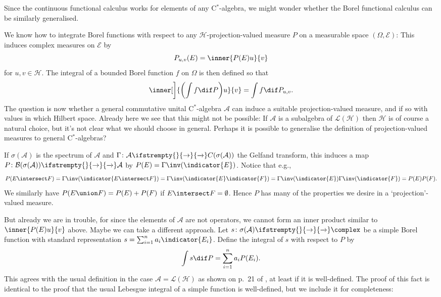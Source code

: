 \documentclass[article, a4paper, 11pt, oneside]{memoir}
\numberwithin{equation}{chapter}
\newcommand{\calB}{\mathcal{B}}
\newcommand{\calE}{\mathcal{E}}
\newcommand{\calA}{\mathcal{A}}
\newcommand{\calL}{\mathcal{L}}
\newcommand{\calH}{\mathcal{H}}
\newcommand{\borel}[1]{\calB(#1)}
\renewcommand\to[1][]{%
    \ifstrempty{#1}{%
        \rightarrow
    }{%
        \xrightarrow[#1]{}
    }%
}
\begin{document}
\begin{remark}
    Since the continuous functional calculus works for elements of any C$^*$-algebra, we might wonder whether the Borel functional calculus can be similarly generalised.
    
    We know how to integrate Borel functions with respect to any $\calH$-projection-valued measure $P$ on a measurable space $(\Omega, \calE)$: This induces complex measures on $\calE$ by
    \begin{equation*}
        P_{u,v}(E)
            = \inner{P(E)u}{v}
    \end{equation*}
    for $u,v \in \calH$. The integral of a bounded Borel function $f$ on $\Omega$ is then defined so that
    \begin{equation*}
        \inner[\bigg]{ \biggl( \int f \dif P \biggr) u }{v}
            = \int f \dif P_{u,v}.
    \end{equation*}
    The question is now whether a general commutative unital C$^*$-algebra $\calA$ can induce a suitable projection-valued measure, and if so with values in which Hilbert space. Already here we see that this might not be possible: If $\calA$ is a subalgebra of $\calL(\calH)$ then $\calH$ is of course a natural choice, but it's not clear what we should choose in general. Perhaps it is possible to generalise the definition of projection-valued measures to general C$^*$-algebras?

    If $\sigma(\calA)$ is the spectrum of $\calA$ and $\Gamma \colon \calA \to C(\sigma(\calA))$ the Gelfand transform, this induces a map $P \colon \borel{\sigma(\calA)} \to \calA$ by $P(E) = \Gamma\inv(\indicator{E})$. Notice that e.g.,
    \begin{equation*}
        P(E \intersect F)
            = \Gamma\inv(\indicator{E \intersect F})
            = \Gamma\inv(\indicator{E} \indicator{F})
            = \Gamma\inv(\indicator{E}) \Gamma\inv(\indicator{F})
            = P(E) P(F).
    \end{equation*}
    We similarly have $P(E \union F) = P(E) + P(F)$ if $E \intersect F = \emptyset$. Hence $P$ has many of the properties we desire in a `projection'-valued measure.
    
    But already we are in trouble, for since the elements of $\calA$ are not operators, we cannot form an inner product similar to $\inner{P(E)u}{v}$ above. Maybe we can take a different approach. Let $s \colon \sigma(\calA) \to \complex$ be a simple Borel function with standard representation $s = \sum_{i=1}^n a_i \indicator{E_i}$. Define the integral of $s$ with respect to $P$ by
    \begin{equation*}
        \int s \dif P
            = \sum_{i=1}^n a_i P(E_i).
    \end{equation*}
    This agrees with the usual definition in the case $\calA = \calL(\calH)$ as shown on p.~21 of \textcite{follandharmonic}, at least if it is well-defined. The proof of this fact is identical to the proof that the usual Lebesgue integral of a simple function is well-defined, but we include it for completeness:
    

\end{remark}
\end{document}
